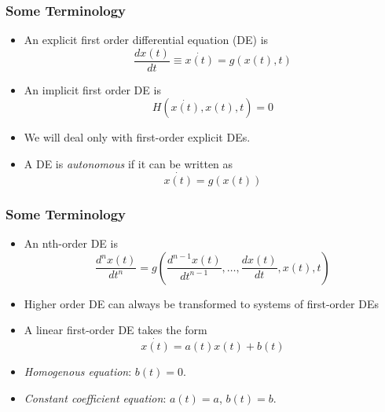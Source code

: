 \documentclass[11pt]{beamer}
\begin{document}
\begin{frame}
\frametitle{Some Terminology}
\begin{itemize}\itemsep2ex
	\item An explicit first order differential equation (DE) is
	\begin{equation}
	\label{DE1}
	\frac{dx(t)}{dt} \equiv \dot{x(t)} = g(x(t),t)
	\end{equation}
	\item An implicit first order DE is
	\begin{equation*}
	H(\dot{x(t)},x(t),t) = 0
	\end{equation*}
	\item We will deal only with first-order explicit DEs.
	\item A DE is \textit{autonomous} if it can be written as
	\begin{equation*}
	\dot{x(t)} = g(x(t))
	\end{equation*}
\end{itemize}
\end{frame}


\begin{frame}
\frametitle{Some Terminology}
\begin{itemize}\itemsep2ex
	\item An nth-order DE is
	\begin{equation*}
	\frac{d^nx(t)}{dt^n} = g \left (\frac{d^{n-1}x(t)}{dt^{n-1}},\dots,\frac{dx(t)}{dt},x(t),t \right)
	\end{equation*}
	\item Higher order DE can always be transformed to systems of first-order DEs
	\item A linear first-order DE takes the form
	\begin{equation*}
	\dot{x(t)} = a(t) x(t) + b(t)
	\end{equation*}
	\item \textit{Homogenous equation}: $b(t)=0$.
	\item \textit{Constant coefficient equation}: $a(t)=a$, $b(t)=b$.
\end{itemize}
\end{frame}

\end{document}
